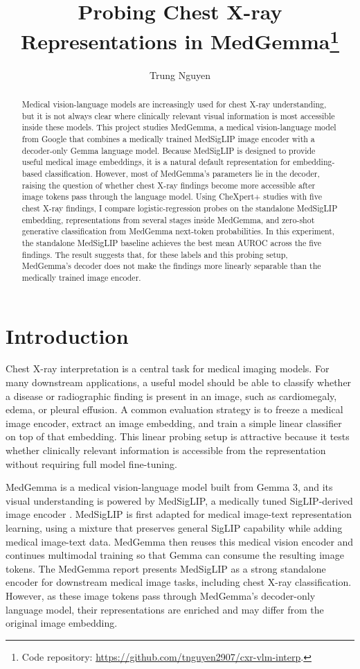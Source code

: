 \documentclass{article}
\title{Probing Chest X-ray Representations in MedGemma\thanks{Code repository: \url{https://github.com/tnguyen2907/cxr-vlm-interp}.}}
\date{}
\author[1]{Trung Nguyen}
\affil[1]{University of Chicago}
\begin{document}
\maketitle

\begin{abstract}
Medical vision-language models are increasingly used for chest X-ray understanding, but it is not always clear where clinically relevant visual information is most accessible inside these models.
This project studies MedGemma, a medical vision-language model from Google that combines a medically trained MedSigLIP image encoder with a decoder-only Gemma language model.
Because MedSigLIP is designed to provide useful medical image embeddings, it is a natural default representation for embedding-based classification.
However, most of MedGemma's parameters lie in the decoder, raising the question of whether chest X-ray findings become more accessible after image tokens pass through the language model.
Using CheXpert+ studies with five chest X-ray findings, I compare logistic-regression probes on the standalone MedSigLIP embedding, representations from several stages inside MedGemma, and zero-shot generative classification from MedGemma next-token probabilities.
In this experiment, the standalone MedSigLIP baseline achieves the best mean AUROC across the five findings.
The result suggests that, for these labels and this probing setup, MedGemma's decoder does not make the findings more linearly separable than the medically trained image encoder.
\end{abstract}

\section{Introduction}

Chest X-ray interpretation is a central task for medical imaging models.
For many downstream applications, a useful model should be able to classify whether a disease or radiographic finding is present in an image, such as cardiomegaly, edema, or pleural effusion.
A common evaluation strategy is to freeze a medical image encoder, extract an image embedding, and train a simple linear classifier on top of that embedding.
This linear probing setup is attractive because it tests whether clinically relevant information is accessible from the representation without requiring full model fine-tuning.

MedGemma is a medical vision-language model built from Gemma 3, and its visual understanding is powered by MedSigLIP, a medically tuned SigLIP-derived image encoder \citep{medgemma2025}.
MedSigLIP is first adapted for medical image-text representation learning, using a mixture that preserves general SigLIP capability while adding medical image-text data.
MedGemma then reuses this medical vision encoder and continues multimodal training so that Gemma can consume the resulting image tokens.
The MedGemma report presents MedSigLIP as a strong standalone encoder for downstream medical image tasks, including chest X-ray classification.
However, as these image tokens pass through MedGemma's decoder-only language model, their representations are enriched and may differ from the original image embedding.
\end{document}
